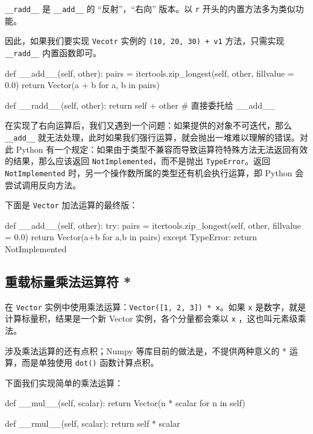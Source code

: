 \texttt{\_\_radd\_\_} 是 \texttt{\_\_add\_\_} 的 ``反射''，``右向'' 版本。以 \texttt{r} 开头的内置方法多为类似功能。

因此，如果我们要实现 \texttt{Vecotr} 实例的 \texttt{(10, 20, 30) + v1} 方法，只需实现 \texttt{\_\_radd\_\_} 内置函数即可。

\begin{python}
def __add__(self, other):
    pairs = itertools.zip_longest(self, other, fillvalue = 0.0)
    return Vector(a + b for a, b in pairs)

def __radd__(self, other):
    return self + other     # 直接委托给 __add__
\end{python}

在实现了右向运算后，我们又遇到一个问题：如果提供的对象不可迭代，那么 \texttt{\_\_add\_\_} 就无法处理，此时如果我们强行运算，就会抛出一堆难以理解的错误。对此 Python 有一个规定：如果由于类型不兼容而导致运算符特殊方法无法返回有效的结果，那么应该返回 \texttt{NotImplemented}，而不是抛出 \texttt{TypeError}。返回 \texttt{NotImplemented} 时，另一个操作数所属的类型还有机会执行运算，即 Python 会尝试调用反向方法。

下面是 \texttt{Vector} 加法运算的最终版：

\begin{python}
def __add__(self, other):
    try:
        pairs = itertools.zip_longest(self, other, fillvalue = 0.0)
        return Vector(a+b for a,b in pairs)
    except TypeError:
        return NotImplemented
\end{python}

\subsection{重载标量乘法运算符 *}

在 \texttt{Vector} 实例中使用乘法运算：\texttt{Vector([1, 2, 3]) * x}。如果 \texttt{x} 是数字，就是计算标量积，结果是一个新 Vector 实例，各个分量都会乘以 \texttt{x} ，这也叫元素级乘法。

涉及乘法运算的还有点积；Numpy 等库目前的做法是，不提供两种意义的 * 运算，而是单独使用 \texttt{dot()} 函数计算点积。

下面我们实现简单的乘法运算：

\begin{python}
def __mul__(self, scalar):
    return Vector(n * scalar for n in self)

def __rmul__(self, scalar):
    return self * scalar
\end{python}


